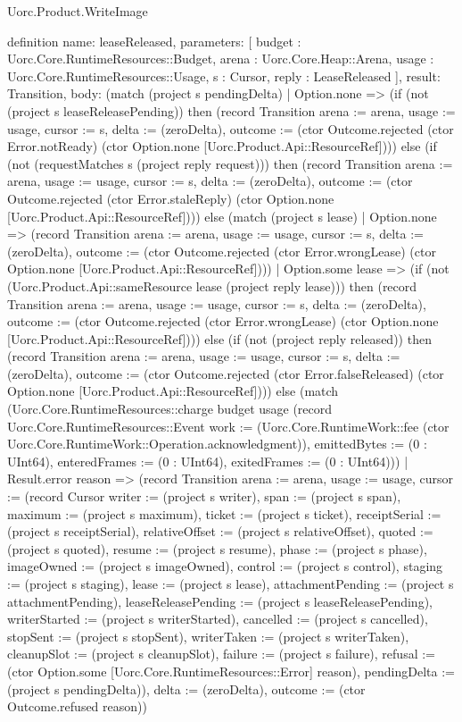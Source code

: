 \begin{lexlean}{Uorc.Product.WriteImage}
\begin{semanticmodule}
definition{
  name: leaseReleased,
  parameters: [
    budget : Uorc.Core.RuntimeResources::Budget,
    arena : Uorc.Core.Heap::Arena,
    usage : Uorc.Core.RuntimeResources::Usage,
    s : Cursor,
    reply : LeaseReleased
  ],
  result: Transition,
  body: (match (project s pendingDelta)
    | Option.none => (if (not (project s leaseReleasePending)) then (record Transition {arena := arena, usage := usage, cursor := s, delta := (zeroDelta), outcome := (ctor Outcome.rejected (ctor Error.notReady) (ctor Option.none [Uorc.Product.Api::ResourceRef]))}) else (if (not (requestMatches s (project reply request))) then (record Transition {arena := arena, usage := usage, cursor := s, delta := (zeroDelta), outcome := (ctor Outcome.rejected (ctor Error.staleReply) (ctor Option.none [Uorc.Product.Api::ResourceRef]))}) else (match (project s lease)
      | Option.none => (record Transition {arena := arena, usage := usage, cursor := s, delta := (zeroDelta), outcome := (ctor Outcome.rejected (ctor Error.wrongLease) (ctor Option.none [Uorc.Product.Api::ResourceRef]))})
      | Option.some lease => (if (not (Uorc.Product.Api::sameResource lease (project reply lease))) then (record Transition {arena := arena, usage := usage, cursor := s, delta := (zeroDelta), outcome := (ctor Outcome.rejected (ctor Error.wrongLease) (ctor Option.none [Uorc.Product.Api::ResourceRef]))}) else (if (not (project reply released)) then (record Transition {arena := arena, usage := usage, cursor := s, delta := (zeroDelta), outcome := (ctor Outcome.rejected (ctor Error.falseReleased) (ctor Option.none [Uorc.Product.Api::ResourceRef]))}) else (match (Uorc.Core.RuntimeResources::charge budget usage (record Uorc.Core.RuntimeResources::Event {work := (Uorc.Core.RuntimeWork::fee (ctor Uorc.Core.RuntimeWork::Operation.acknowledgment)), emittedBytes := (0 : UInt64), enteredFrames := (0 : UInt64), exitedFrames := (0 : UInt64)}))
        | Result.error reason => (record Transition {arena := arena, usage := usage, cursor := (record Cursor {writer := (project s writer), span := (project s span), maximum := (project s maximum), ticket := (project s ticket), receiptSerial := (project s receiptSerial), relativeOffset := (project s relativeOffset), quoted := (project s quoted), resume := (project s resume), phase := (project s phase), imageOwned := (project s imageOwned), control := (project s control), staging := (project s staging), lease := (project s lease), attachmentPending := (project s attachmentPending), leaseReleasePending := (project s leaseReleasePending), writerStarted := (project s writerStarted), cancelled := (project s cancelled), stopSent := (project s stopSent), writerTaken := (project s writerTaken), cleanupSlot := (project s cleanupSlot), failure := (project s failure), refusal := (ctor Option.some [Uorc.Core.RuntimeResources::Error] reason), pendingDelta := (project s pendingDelta)}), delta := (zeroDelta), outcome := (ctor Outcome.refused reason)})
}
\end{semanticmodule}
\end{lexlean}
